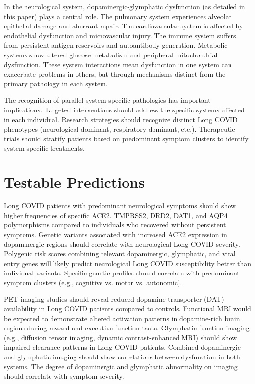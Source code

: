 \documentclass[12pt]{article}
\begin{document}
In the neurological system, dopaminergic-glymphatic dysfunction (as detailed in this paper) plays a central role. The pulmonary system experiences alveolar epithelial damage and aberrant repair. The cardiovascular system is affected by endothelial dysfunction and microvascular injury. The immune system suffers from persistent antigen reservoirs and autoantibody generation. Metabolic systems show altered glucose metabolism and peripheral mitochondrial dysfunction. These system interactions mean dysfunction in one system can exacerbate problems in others, but through mechanisms distinct from the primary pathology in each system.

The recognition of parallel system-specific pathologies has important implications. Targeted interventions should address the specific systems affected in each individual. Research strategies should recognize distinct Long COVID phenotypes (neurological-dominant, respiratory-dominant, etc.). Therapeutic trials should stratify patients based on predominant symptom clusters to identify system-specific treatments.

\section{Testable Predictions}

Long COVID patients with predominant neurological symptoms should show higher frequencies of specific ACE2, TMPRSS2, DRD2, DAT1, and AQP4 polymorphisms compared to individuals who recovered without persistent symptoms. Genetic variants associated with increased ACE2 expression in dopaminergic regions should correlate with neurological Long COVID severity. Polygenic risk scores combining relevant dopaminergic, glymphatic, and viral entry genes will likely predict neurological Long COVID susceptibility better than individual variants. Specific genetic profiles should correlate with predominant symptom clusters (e.g., cognitive vs. motor vs. autonomic).

PET imaging studies should reveal reduced dopamine transporter (DAT) availability in Long COVID patients compared to controls. Functional MRI would be expected to demonstrate altered activation patterns in dopamine-rich brain regions during reward and executive function tasks. Glymphatic function imaging (e.g., diffusion tensor imaging, dynamic contrast-enhanced MRI) should show impaired clearance patterns in Long COVID patients. Combined dopaminergic and glymphatic imaging should show correlations between dysfunction in both systems. The degree of dopaminergic and glymphatic abnormality on imaging should correlate with symptom severity.
\end{document}
